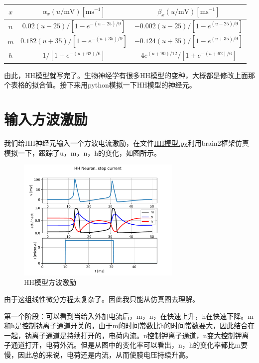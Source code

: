 \documentclass[12pt, a4paper, oneside]{ctexbook}
\begin{document}
\begin{tabular}{ccc}
    \hline$x$ & $\alpha_x(u / \mathrm{mV})\left[\mathrm{ms}^{-1}\right]$ & $\beta_x(u / \mathrm{mV})\left[\mathrm{ms}^{-1}\right]$ \\
    \hline$n$ & $0.02(u-25) /\left[1-e^{-(u-25) / 9}\right]$ & $-0.002(u-25) /\left[1-e^{(u-25) / 9}\right]$ \\
    $m$ & $0.182(u+35) /\left[1-e^{-(u+35) / 9}\right]$ & $-0.124(u+35) /\left[1-e^{(u+35) / 9}\right]$ \\
    $h$ & $1 /\left[1+e^{-(u+62) / 6}\right]$ & $4 e^{(u+90) / 12} /\left[1+e^{-(u+62) / 6}\right]$ \\
    \hline
\end{tabular}

由此，HH模型就写完了。生物神经学有很多HH模型的变种，大概都是修改上面那个表格的拟合值。接下来用python模拟一下HH模型的神经元。

\section{输入方波激励}

我们给HH神经元输入一个方波电流激励，在文件\href{./python仿真代码/HH模型.py}{HH模型.py}利用brain2框架仿真模拟一下，跟踪了u，m，n，h的变化，如图所示。

\begin{figure}[H]
    \centering
    \includegraphics[width=0.7\textwidth]{HH模型方波激励.pdf}
    \caption{HH模型方波激励}
\end{figure}

由于这组线性微分方程太复杂了。因此我只能从仿真图去理解。

第一个阶段：可以看到当给入外加电流后，m，n，在快速上升，h在快速下降。m和h是控制钠离子通道开关的，由于m的时间常数比h的时间常数要大，因此结合在一起，钠离子通道是持续打开的，电荷内流。n控制钾离子通道，n变大控制钾离子通道打开，电荷外流。但是从图中的变化率可以看出，n，h的变化率都比m要慢，因此总的来说，电荷还是内流，从而使膜电压持续升高。
\end{document}
